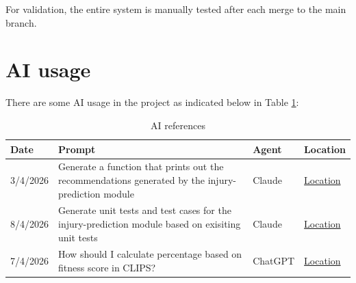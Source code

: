 \documentclass{article}
\begin{document}
For validation, the entire system is manually tested after each merge to the main branch.

\section{AI usage}

There are some AI usage in the project as indicated below in Table \ref{tab:AI-references}:

\begin{table}[h]
\centering
\begin{tabular}{|p{2cm}|p{8cm}|p{2cm}|p{2cm}|}
\hline
\textbf{Date} & \textbf{Prompt} & \textbf{Agent} & \textbf{Location} \\
\hline
3/4/2026 & Generate a function that prints out the recommendations generated by the injury-prediction module &  Claude & \href{https://github.com/joshpham97/COMP474Project_OptionB_PhamTran_ExerciseRecommender/blob/main/system/output.clp#L164-L183}{Location} \\
\hline
8/4/2026 & Generate unit tests and test cases for the injury-prediction module based on exisiting unit tests &  Claude & \href{https://github.com/joshpham97/COMP474Project_OptionB_PhamTran_ExerciseRecommender/blob/main/system/tests/injury-prediction.clp}{Location} \\
\hline
7/4/2026 & How should I calculate percentage based on fitness score in CLIPS? & ChatGPT & \href{https://github.com/joshpham97/COMP474Project_OptionB_PhamTran_ExerciseRecommender/blob/main/system/rules/fitness-level.clp#L61-L77}{Location}\\
\hline
\end{tabular}
\caption{AI references}
\label{tab:AI-references}
\end{table}

    
\end{document}
